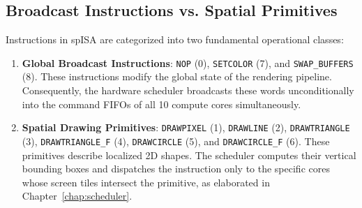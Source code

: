 \subsection{Broadcast Instructions vs. Spatial Primitives}
Instructions in spISA are categorized into two fundamental operational classes:
\begin{enumerate}
    \item \textbf{Global Broadcast Instructions}: \texttt{NOP} (0), \texttt{SETCOLOR} (7), and \texttt{SWAP\_BUFFERS} (8). These instructions modify the global state of the rendering pipeline. Consequently, the hardware scheduler broadcasts these words unconditionally into the command FIFOs of all 10 compute cores simultaneously.
    \item \textbf{Spatial Drawing Primitives}: \texttt{DRAWPIXEL} (1), \texttt{DRAWLINE} (2), \texttt{DRAWTRIANGLE} (3), \texttt{DRAWTRIANGLE\_F} (4), \texttt{DRAWCIRCLE} (5), and \texttt{DRAWCIRCLE\_F} (6). These primitives describe localized 2D shapes. The scheduler computes their vertical bounding boxes and dispatches the instruction only to the specific cores whose screen tiles intersect the primitive, as elaborated in Chapter~\ref{chap:scheduler}.
\end{enumerate}
